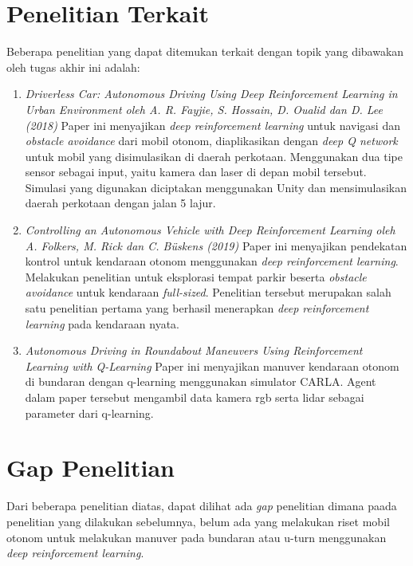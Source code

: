 \section{Penelitian Terkait}
\label{sec:penelitian_terkait}

Beberapa penelitian yang dapat ditemukan terkait dengan topik yang dibawakan oleh tugas akhir ini adalah:
\begin{enumerate}
	\item \textit{Driverless Car: Autonomous Driving Using Deep Reinforcement Learning in Urban Environment oleh A. R. Fayjie, S. Hossain, D. Oualid dan D. Lee (2018)}\newline
	Paper ini menyajikan \textit{deep reinforcement learning }untuk navigasi dan \textit{obstacle avoidance }dari mobil otonom, diaplikasikan dengan \textit{deep Q network }untuk mobil yang disimulasikan di daerah perkotaan. Menggunakan dua tipe sensor sebagai input, yaitu kamera dan laser di depan mobil tersebut. Simulasi yang digunakan diciptakan menggunakan Unity dan mensimulasikan daerah perkotaan dengan jalan 5 lajur.\cite{cit:1}
	
	\item \textit{Controlling an Autonomous Vehicle with Deep Reinforcement Learning oleh A. Folkers, M. Rick dan C. Büskens (2019)}\newline
	Paper ini menyajikan pendekatan kontrol untuk kendaraan otonom menggunakan \textit{deep reinforcement learning}. Melakukan penelitian untuk eksplorasi tempat parkir beserta \textit{obstacle avoidance }untuk kendaraan \textit{full-sized}. Penelitian tersebut merupakan salah satu penelitian pertama yang berhasil menerapkan \textit{deep reinforcement learning }pada kendaraan nyata.\cite{cit:2}
	
	\item \textit{Autonomous Driving in Roundabout Maneuvers Using Reinforcement Learning with Q-Learning}\newline
	Paper ini menyajikan manuver kendaraan otonom di bundaran dengan q-learning menggunakan simulator CARLA.\cite{cit:autonomdrive_roundabout_qlearning} Agent dalam paper tersebut mengambil data kamera rgb serta lidar sebagai parameter dari q-learning.
	
\end{enumerate}

\section{Gap Penelitian}
\label{sec:gap_penelitian}

Dari beberapa penelitian diatas, dapat dilihat ada \textit{gap} penelitian dimana paada penelitian yang dilakukan sebelumnya, belum ada yang melakukan riset mobil otonom untuk melakukan manuver pada bundaran atau u-turn menggunakan \textit{deep reinforcement learning}.
